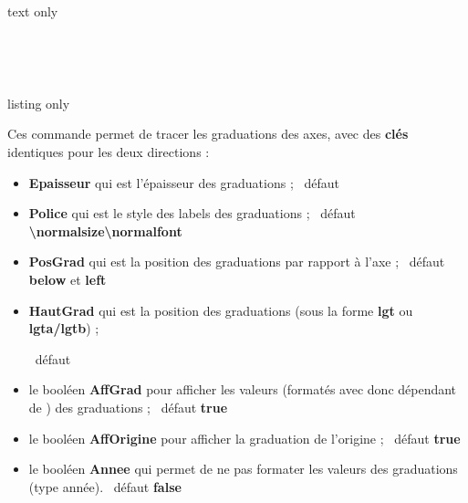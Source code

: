 \documentclass[a4paper,french,11pt]{article}
\newcommand\ctex[1]{\tcbox[vignettelatex]{#1}}
\newcommand\Cle[1]{{\bfseries\sffamily\textlangle #1\textrangle}}
\begin{document}
\begin{PresCodeSortiePL}{text only}
\hfill~
\begin{tikzpicture}%
	[x=0.3cm,y=0.06cm,%
	Ox=1992,xmin=1992,xmax=2012,xgrille=2,xgrilles=1,%
	Oy=1640,ymin=1640,ymax=1730,ygrille=10,ygrilles=5]
	\AxesTikz
\end{tikzpicture}
~~
\begin{tikzpicture}%
	[x=0.3cm,y=0.06cm,%
	Ox=1992,xmin=1992,xmax=2012,xgrille=2,xgrilles=1,%
	Oy=1640,ymin=1640,ymax=1730,ygrille=10,ygrilles=5]
	\AxesTikz%
		[AffLabel=xy,Labelx={Année},Labely={Altitude},%
		PosLabelx={below right},PosLabely={above left},%
		Police=\small\sffamily]
\end{tikzpicture}
\hfill~
\end{PresCodeSortiePL}


\begin{PresCodeTexPL}{listing only}
\end{PresCodeTexPL}

\begin{cautionblock}
Ces commande permet de tracer les graduations des axes, avec des \Cle{clés} identiques pour les deux directions :

\begin{itemize}
	\item \Cle{Epaisseur} qui est l'épaisseur des graduations ; \hfill~défaut \Cle{1pt}
	\item \Cle{Police} qui est le style des labels des graduations ; \hfill~défaut \Cle{\textbackslash{}normalsize\textbackslash{}normalfont}
	\item \Cle{PosGrad} qui est la position des graduations par rapport à l'axe ; \hfill~défaut \Cle{below} et \Cle{left}
	\item \Cle{HautGrad} qui est la position des graduations (sous la forme \Cle{lgt} ou \Cle{lgta/lgtb}) ;
	
	\hfill~défaut \Cle{4pt}
	\item le booléen \Cle{AffGrad} pour afficher les valeurs (formatés avec \ctex{num} donc dépendant de \ctex{sisetup}) des graduations  ; \hfill~défaut \Cle{true}
	\item le booléen \Cle{AffOrigine} pour afficher la graduation de l'origine ; \hfill~défaut \Cle{true}
	\item le booléen \Cle{Annee} qui permet de ne pas formater les valeurs des graduations (type \textsf{année}). \hfill~défaut \Cle{false}
\end{itemize}
\vspace*{-\baselineskip}\leavevmode
\end{cautionblock}
\end{document}
